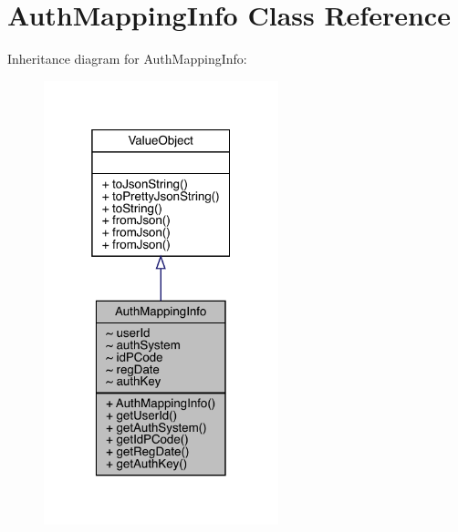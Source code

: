 \hypertarget{classcom_1_1toast_1_1android_1_1gamebase_1_1auth_1_1data_1_1_auth_mapping_info}{}\section{Auth\+Mapping\+Info Class Reference}
\label{classcom_1_1toast_1_1android_1_1gamebase_1_1auth_1_1data_1_1_auth_mapping_info}


Inheritance diagram for Auth\+Mapping\+Info\+:
\nopagebreak
\begin{figure}[H]
\begin{center}
\leavevmode
\includegraphics[width=193pt]{classcom_1_1toast_1_1android_1_1gamebase_1_1auth_1_1data_1_1_auth_mapping_info__inherit__graph}
\end{center}
\end{figure}


